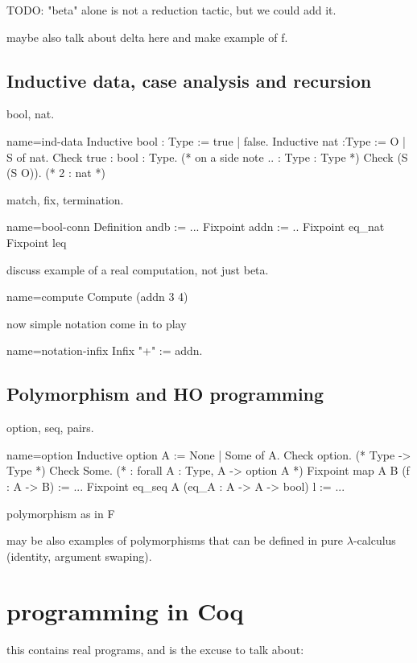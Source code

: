 TODO: "beta" alone is not a reduction tactic, but we could add it.

maybe also talk about delta here and make example of f.

\subsection{Inductive data, case analysis and recursion}
bool, nat.

\begin{coq}{name=ind-data}{}
Inductive bool : Type := true | false.
Inductive nat :Type := O | S of nat.
Check true : bool : Type. (* on a side note .. : Type : Type *)
Check (S (S O)). (* 2 : nat *)
\end{coq}




match, fix, termination.

\begin{coq}{name=bool-conn}{}
Definition andb := ...
Fixpoint addn := ..
Fixpoint eq_nat
Fixpoint leq
\end{coq}

discuss example of a real computation, not just beta.

\begin{coq}{name=compute}{}
Compute (addn 3 4)
\end{coq}

now simple notation come in to play

\begin{coq}{name=notation-infix}{}
Infix "+" := addn.
\end{coq}

\subsection{Polymorphism and HO programming}
option, seq, pairs.

\begin{coq}{name=option}{}
Inductive option A := None | Some of A.
Check option. (* Type -> Type *)
Check Some. (* : forall A : Type, A -> option A *)
Fixpoint map A B (f : A -> B) := ...
Fixpoint eq_seq A (eq_A : A -> A -> bool) l := ...
\end{coq}

polymorphism as in F

may be also examples of polymorphisms that can be defined in pure
$\lambda$-calculus (identity, argument swaping).

\section{programming in Coq}
this contains real programs, and is the excuse to talk about:

